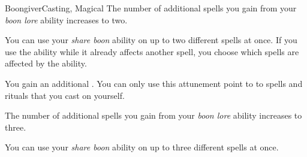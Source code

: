 \begin{feat}{Boongiver}{Casting, Magical}
         The number of additional  spells you gain from your \textit{boon lore} ability increases to two.

         You can use your \textit{share boon} ability on up to two different spells at once.
        If you use the ability while it already affects another spell, you choose which spells are affected by the ability.

         You gain an additional .
        You can only use this attunement point to  to spells and rituals that you cast on yourself.

         The number of additional  spells you gain from your \textit{boon lore} ability increases to three.

         You can use your \textit{share boon} ability on up to three different spells at once.
    \end{feat}

